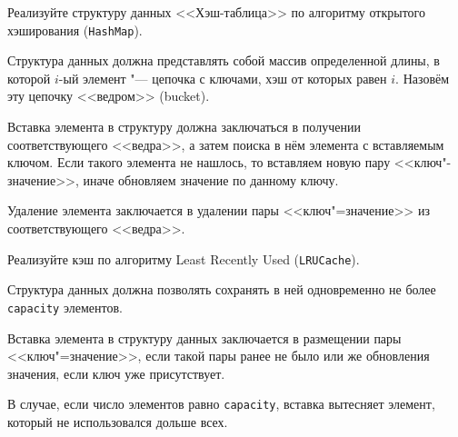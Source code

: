 \documentclass[a4paper, 10pt]{extarticle}
\begin{document}
\begin{tsk}[Хэш"=таблица. Бонус 25\%]
    Реализуйте структуру данных <<Хэш-таблица>> по алгоритму открытого хэширования (\verb|HashMap|).

    Структура данных должна представлять собой массив определенной длины, в которой $i$-ый элемент "--- цепочка с ключами, хэш от которых равен $i$. Назовём эту цепочку <<ведром>> (bucket).

    Вставка элемента в структуру должна заключаться в получении соответствующего <<ведра>>, а затем поиска в нём элемента с вставляемым ключом. Если такого элемента не нашлось, то вставляем новую пару <<ключ"-значение>>, иначе обновляем значение по данному ключу.

    Удаление элемента заключается в удалении пары <<ключ"=значение>> из соответствующего <<ведра>>.


\end{tsk}

\begin{tsk}[LRU"=кэш. Бонус 25\%]
    Реализуйте кэш по алгоритму Least Recently Used (\verb|LRUCache|). 

    Структура данных должна позволять сохранять в ней одновременно не более \verb|capacity| элементов.

    Вставка элемента в структуру данных заключается в размещении пары <<ключ"=значение>>, если такой пары ранее не было или же обновления значения, если ключ уже присутствует.

    В случае, если число элементов равно \verb|capacity|, вставка вытесняет элемент, который не использовался дольше всех.
\end{tsk}
\end{document}
